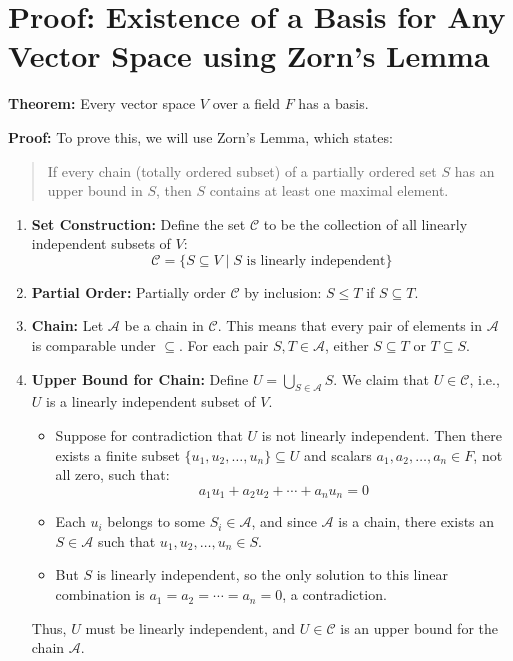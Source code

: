 \newpage
\section*{Proof: Existence of a Basis for Any Vector Space using Zorn's Lemma}

\textbf{Theorem:} Every vector space \(V\) over a field \(F\) has a basis.

\textbf{Proof:} To prove this, we will use Zorn's Lemma, which states:
\begin{quote}
	If every chain (totally ordered subset) of a partially ordered set \(S\) has an upper bound in \(S\), then \(S\) contains at least one maximal element.
\end{quote}

\begin{enumerate}
	\item \textbf{Set Construction:}
	Define the set \(\mathcal{C}\) to be the collection of all linearly independent subsets of \(V\):
	\[
	\mathcal{C} = \{ S \subseteq V \mid S \text{ is linearly independent} \}
	\]
	
	\item \textbf{Partial Order:}
	Partially order \(\mathcal{C}\) by inclusion: \(S \leq T\) if \(S \subseteq T\).
	
	\item \textbf{Chain:}
	Let \(\mathcal{A}\) be a chain in \(\mathcal{C}\). This means that every pair of elements in \(\mathcal{A}\) is comparable under \(\subseteq\). For each pair \(S, T \in \mathcal{A}\), either \(S \subseteq T\) or \(T \subseteq S\).
	
	\item \textbf{Upper Bound for Chain:}
	Define \(U = \bigcup_{S \in \mathcal{A}} S\). We claim that \(U \in \mathcal{C}\), i.e., \(U\) is a linearly independent subset of \(V\).
	\begin{itemize}
		\item Suppose for contradiction that \(U\) is not linearly independent. Then there exists a finite subset \(\{u_1, u_2, \ldots, u_n\} \subseteq U\) and scalars \(a_1, a_2, \ldots, a_n \in F\), not all zero, such that:
		\[
		a_1 u_1 + a_2 u_2 + \cdots + a_n u_n = 0
		\]
		\item Each \(u_i\) belongs to some \(S_i \in \mathcal{A}\), and since \(\mathcal{A}\) is a chain, there exists an \(S \in \mathcal{A}\) such that \(u_1, u_2, \ldots, u_n \in S\).
		\item But \(S\) is linearly independent, so the only solution to this linear combination is \(a_1 = a_2 = \cdots = a_n = 0\), a contradiction.
	\end{itemize}
	Thus, \(U\) must be linearly independent, and \(U \in \mathcal{C}\) is an upper bound for the chain \(\mathcal{A}\).
	

\end{enumerate}
